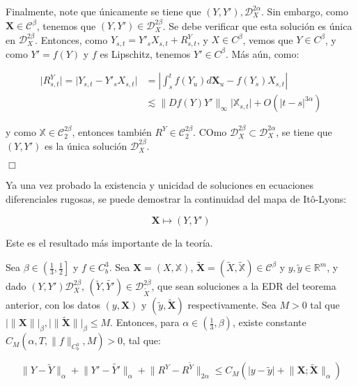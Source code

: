 Finalmente, note que únicamente se tiene que $(Y, Y') ,\mathscr{D}^{2\alpha}_X$. Sin embargo, como $\mathbf{X} \in \mathscr{C}^{\beta}$, tenemos que $(Y, Y') \in \mathscr{D}^{2\beta}_X$. Se debe verificar que esta solución es única en $\mathscr{D}^{2\beta}_X$. Entonces, como $Y_{s,t} = Y'_s X_{s,t} + R^Y_{s,t}$, y $X \in C^{\beta}$, vemos que $Y \in C^{\beta}$, y como $Y' = f(Y)$ y $f$ es Lipschitz, tenemos $Y' \in C^{\beta}$. Más aún, como:

\begin{align*}
	\lvert R^Y_{s,t} \rvert = \lvert Y_{s,t} - Y'_s X_{s,t} \rvert &= \left\lvert \int_s^t f(Y_u) d\mathbf{X}_u - f(Y_s) X_{s,t} \right\rvert \\
	&\lesssim \lVert Df(Y) Y' \rVert_{\infty} \lvert \mathbb{X}_{s,t} \rvert + O( \lvert t - s \rvert^{3\alpha} )
\end{align*}

y como $\mathbb{X} \in \mathcal{C}^{2\beta}_2$, entonces también $R^Y \in \mathcal{C}^{2\beta}_2$. COmo $\mathscr{D}^{2\beta}_X \subset \mathscr{D}^{2\alpha}_X$, se tiene que $(Y,Y')$ es la única solución $\mathscr{D}^{2\beta}_X$.

\begin{flushright}
	$\Box$
\end{flushright}
		

Ya una vez probado la existencia y unicidad de soluciones en ecuaciones diferenciales rugosas, se puede demostrar la continuidad del mapa de Itô-Lyons:

\[
	\mathbf{X} \mapsto (Y, Y')
\]

Este es el resultado más importante de la teoría.

\begin{theorem}
	Sea $\beta \in \left( \frac{1}{3}, \frac{1}{2} \right]$ y $f \in C^3_b$. Sea $\mathbf{X} = (X, \mathbb{X})$, $\tilde{\mathbf{X}} = (\tilde{X}, \tilde{\mathbb{X}}) \in \mathscr{C}^{\beta}$ y $y, \tilde{y} \in \mathbb{R}^m$, y dado $(Y, Y') \mathscr{D}_X^{2\beta}$, $(\tilde{Y}, \tilde{Y'}) \in \mathscr{D}_{\tilde{X}}^{2\beta}$, que sean soluciones a la EDR del teorema anterior, con los datos $(y, \mathbf{X})$ y $(\tilde{y}, \tilde{\mathbf{X}})$ respectivamente. Sea $M > 0$ tal que $\lvert \lVert \mathbf{X} \rVert \rvert_{\beta}, \lvert \lVert \mathbf{ \tilde{X} } \rVert \rvert_{\beta} \leq M$. Entonces, para $\alpha \in \left( \frac{1}{3}, \beta \right)$, existe constante $C_M(\alpha, T, \lVert f \rVert_{C^3_b}, M) > 0$, tal que:

    \[
        \lVert Y - \tilde{Y} \rVert_{\alpha} + \lVert Y' - \tilde{Y'} \rVert_{\alpha} + \lVert R^Y - R^{\tilde{Y}}\rVert_{2\alpha} \leq C_M \left( \lvert y - \tilde{y} \rvert + \lVert \mathbf{X}; \mathbf{ \tilde{X} } \rVert_{\alpha} \right)
    \]

\end{theorem}


